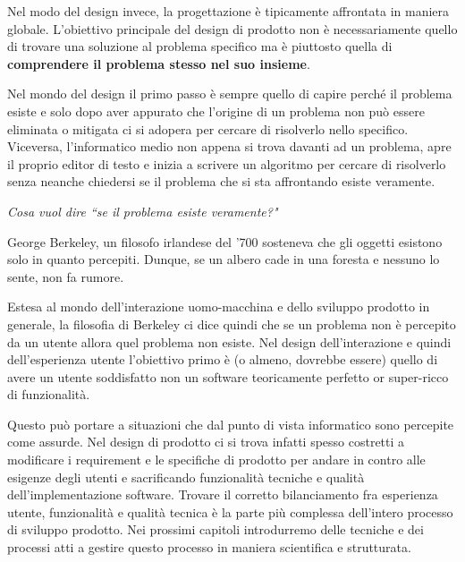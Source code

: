 Nel modo del design invece, la progettazione è tipicamente affrontata in maniera globale. L'obiettivo principale del design di prodotto non è
necessariamente quello di trovare una soluzione al problema specifico ma è piuttosto quella di \textbf{comprendere il problema stesso nel suo insieme}.

Nel mondo del design il primo passo è sempre quello di capire perché il problema esiste e solo dopo aver appurato che l'origine di un problema non può
essere eliminata o mitigata ci si adopera per cercare di risolverlo nello specifico. Viceversa, l'informatico medio non appena si trova davanti ad un
problema, apre il proprio editor di testo e inizia a scrivere un algoritmo per cercare di risolverlo senza neanche chiedersi se il problema che si sta
affrontando esiste veramente.

\textit{Cosa vuol dire ``se il problema esiste veramente?"}
\vspace{\baselineskip}

George Berkeley, un filosofo irlandese del '700 sosteneva che gli oggetti esistono solo in quanto percepiti. Dunque, se un albero cade in una foresta
e nessuno lo sente, non fa rumore.

Estesa al mondo dell'interazione uomo-macchina e dello sviluppo prodotto in generale, la filosofia di Berkeley ci dice quindi che se un problema non è
percepito da un utente allora quel problema non esiste. Nel design dell'interazione e quindi dell'esperienza utente l'obiettivo primo è (o almeno, dovrebbe
essere) quello di avere un utente soddisfatto non un software teoricamente perfetto or super-ricco di funzionalità.

 
Questo può portare a situazioni che dal punto di vista informatico sono percepite come assurde. Nel design di prodotto ci si trova infatti spesso
costretti a modificare i requirement e le specifiche di prodotto per andare in contro alle esigenze degli utenti e sacrificando funzionalità tecniche
e qualità dell'implementazione software.
Trovare il corretto bilanciamento fra esperienza utente, funzionalità e qualità tecnica è la parte più complessa dell'intero processo di sviluppo
prodotto. Nei prossimi capitoli introdurremo delle tecniche e dei processi atti a gestire questo processo in maniera scientifica e strutturata.
 
